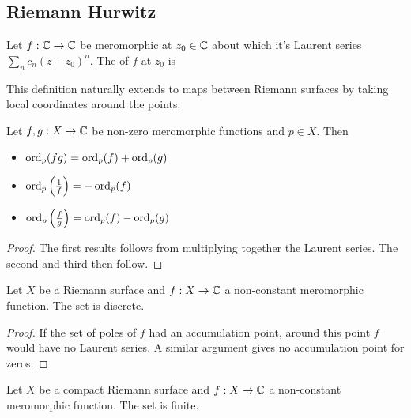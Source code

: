 \documentclass{article}
\begin{document}
\subsection{Riemann Hurwitz}

\begin{definition}
	Let $f:\mathbb{C} \to \mathbb{C}$ be meromorphic at $z_0 \in \mathbb{C}$ about which it's Laurent series $\sum_n c_n (z-z_0)^n$. The  of $f$ at $z_0$ is 
\end{definition}

\begin{remark}
	This definition naturally extends to maps between Riemann surfaces by taking local coordinates around the points. 
\end{remark}

\begin{lemma}
	Let $f,g : X \to \mathbb{C}$ be non-zero meromorphic functions and $p  \in X$. Then 
	\begin{itemize}
		\item $\operatorname{ord}_p(fg) = \operatorname{ord}_p(f) + \operatorname{ord}_p(g)$
		\item $\operatorname{ord}_p\left( \frac{1}{f} \right) = -\operatorname{ord}_p(f)$
		\item $\operatorname{ord}_p\left( \frac{f}{g} \right) = \operatorname{ord}_p(f) - \operatorname{ord}_p(g)$
	\end{itemize}
\end{lemma}
\begin{proof}
	The first results follows from multiplying together the Laurent series. The second and third then follow. 
\end{proof}

\begin{lemma}
	Let $X$ be a Riemann surface and $f:X \to \mathbb{C}$ a non-constant meromorphic function. The set
	is discrete.
\end{lemma}
\begin{proof}
	If the set of poles of $f$ had an accumulation point, around this point $f$ would have no Laurent series. A similar argument gives no accumulation point for zeros. 
\end{proof}

\begin{corollary}
	Let $X$ be a  compact Riemann surface and $f:X \to \mathbb{C}$ a non-constant meromorphic function. The set
	is finite.
\end{corollary}
\end{document}

